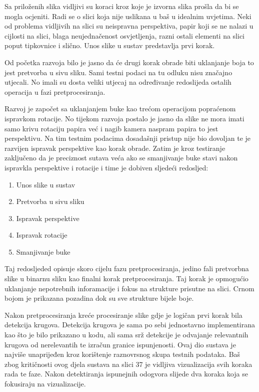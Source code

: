 \documentclass{foi}
\begin{document}
Sa priloženih slika vidljivi su koraci kroz koje je izvorna slika prošla da bi se mogla ocjeniti. Radi se o slici koja nije uslikana u baš u idealnim uvjetima. Neki od problema vidljivih na slici su neispravna perspektiva, papir koji se ne nalazi u cijlosti na slici, blaga neujednačenost osvjetljenja, razni ostali elementi na slici poput tipkovnice i slično. Unos slike u sustav predstavlja prvi korak.

Od početka razvoja bilo je jasno da će drugi korak obrade biti uklanjanje boja to jest pretvorba u sivu sliku. Sami testni podaci na tu odluku nisu značajno utjecali. No imali su dosta veliki utjecaj na određivanje redoslijeda ostalih operacija u fazi pretprocesiranja.

Razvoj je započet sa uklanjanjem buke kao trećom operacijom popraćenom ispravkom rotacije. No tijekom razvoja postalo je jasno da slike ne mora imati samo krivu rotaciju papira već i nagib kamera naspram papira to jest perspektivu. Na tim testnim podacima dosadašnji pristup nije bio dovoljan te je razvijen ispravak perspektive kao korak obrade. Zatim je kroz testiranje zaključeno da je preciznost sutava veća ako se smanjivanje buke stavi nakon ispravkla perspektive i rotacije i time je dobiven sljedeći redosljed:

\begin{enumerate}
    \item Unos slike u sustav
    \item Pretvorba u sivu sliku
    \item Ispravak perspektive
    \item Ispravak rotacije
    \item Smanjivanje buke
\end{enumerate}

Taj redosljeded opisuje skoro cijelu fazu pretprocesiranja, jedino fali pretvorbna slike u binarnu sliku kao finalni korak pretprocesiranja. Taj korak je opmogućio uklanjanje nepotrebnih inforamacije i fokus na strukture prisutne na slici. Crnom bojom je prikazana pozadina dok su sve strukture bijele boje.

Nakon pretprocesiranja kreće procesiranje slike gdje je logičan prvi korak bila detekcija krugova. Detekcija krugova je sama po sebi jednostavno implementirana kao što je bilo prikazano u kodu, ali sama srž detekcije je odvajanje relevantnih krugova od nerelevantih te izračun granice ispunjenosti. Ovaj dio sustava je najviše unaprijeđen kroz korištenje raznovrsnog skupa testnih podataka. Baš zbog kritičnosti ovog djela sustava na slici 37 je vidljiva vizualizacija svih koraka rada te faze. Nakon detektiranja ispunejnih odogvora slijede dva koraka koja se fokusiraju na vizualizacije.
\end{document}
